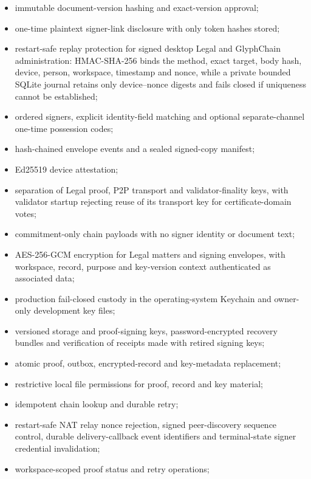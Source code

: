 \begin{itemize}
  \item immutable document-version hashing and exact-version approval;
  \item one-time plaintext signer-link disclosure with only token hashes stored;
  \item restart-safe replay protection for signed desktop Legal and GlyphChain
        administration: HMAC-SHA-256 binds the method, exact target, body hash,
        device, person, workspace, timestamp and nonce, while a private bounded
        SQLite journal retains only device--nonce digests and fails closed if
        uniqueness cannot be established;
  \item ordered signers, explicit identity-field matching and optional
        separate-channel one-time possession codes;
  \item hash-chained envelope events and a sealed signed-copy manifest;
  \item Ed25519 device attestation;
  \item separation of Legal proof, P2P transport and validator-finality keys,
        with validator startup rejecting reuse of its transport key for
        certificate-domain votes;
  \item commitment-only chain payloads with no signer identity or document text;
  \item AES-256-GCM encryption for Legal matters and signing envelopes, with
        workspace, record, purpose and key-version context authenticated as
        associated data;
  \item production fail-closed custody in the operating-system Keychain and
        owner-only development key files;
  \item versioned storage and proof-signing keys, password-encrypted recovery
        bundles and verification of receipts made with retired signing keys;
  \item atomic proof, outbox, encrypted-record and key-metadata replacement;
  \item restrictive local file permissions for proof, record and key material;
  \item idempotent chain lookup and durable retry;
  \item restart-safe NAT relay nonce rejection, signed peer-discovery sequence
        control, durable delivery-callback event identifiers and terminal-state
        signer credential invalidation;
  \item workspace-scoped proof status and retry operations;

\end{itemize}
